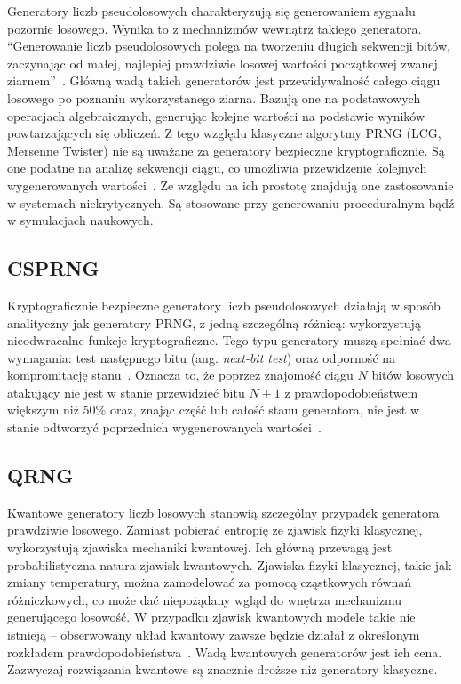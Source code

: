 \noindent Generatory liczb pseudolosowych charakteryzują się generowaniem sygnału 
pozornie losowego. Wynika to z mechanizmów wewnątrz takiego generatora. 
\enquote{Generowanie liczb pseudolosowych polega na tworzeniu długich sekwencji 
bitów, zaczynając od małej, najlepiej prawdziwie losowej wartości początkowej 
zwanej ziarnem}~\cite{2023anstasios-panagiotis-georgis-yannis}. Główną wadą 
takich generatorów jest przewidywalność całego ciągu losowego po poznaniu 
wykorzystanego ziarna. 
Bazują one na podstawowych operacjach algebraicznych, generując kolejne 
wartości na podstawie wyników powtarzających się obliczeń. Z tego względu 
klasyczne algorytmy PRNG (LCG, Mersenne Twister) nie są uważane za generatory 
bezpieczne kryptograficznie. Są one podatne na analizę sekwencji ciągu, co 
umożliwia przewidzenie kolejnych wygenerowanych 
wartości~\cite{2024-predicting-prngs}.
Ze względu na ich prostotę znajdują one zastosowanie w systemach niekrytycznych. 
Są stosowane przy generowaniu proceduralnym bądź w symulacjach naukowych.

\subsection{CSPRNG}

\noindent Kryptograficznie bezpieczne generatory liczb pseudolosowych działają 
w sposób analityczny jak generatory PRNG, z jedną szczególną różnicą: 
wykorzystują nieodwracalne funkcje kryptograficzne. Tego typu generatory 
muszą spełniać dwa wymagania: test następnego bitu (ang. \textit{next-bit test}) oraz odporność na kompromitację 
stanu~\cite{2023Analisis-of-CSPRNG}. 
Oznacza to, że poprzez znajomość ciągu $N$ bitów losowych atakujący nie jest 
w stanie przewidzieć bitu $N+1$ z prawdopodobieństwem większym niż 50\% oraz, 
znając część lub całość stanu generatora, nie jest w stanie odtworzyć 
poprzednich wygenerowanych wartości~\cite{2023Analisis-of-CSPRNG}.

\subsection{QRNG}

\noindent Kwantowe generatory liczb losowych stanowią szczególny przypadek 
generatora prawdziwie losowego. Zamiast pobierać entropię ze zjawisk fizyki 
klasycznej, wykorzystują zjawiska mechaniki kwantowej. 
Ich główną przewagą jest probabilistyczna natura zjawisk kwantowych. Zjawiska 
fizyki klasycznej, takie jak zmiany temperatury, można zamodelować za pomocą cząstkowych 
równań różniczkowych, co może dać niepożądany wgląd do wnętrza mechanizmu 
generującego losowość. W przypadku zjawisk kwantowych modele takie nie 
istnieją -- obserwowany układ kwantowy zawsze będzie działał z określonym 
rozkładem prawdopodobieństwa~\cite{Quantum-physics-peter-kok}. 
Wadą kwantowych generatorów jest ich cena. Zazwyczaj rozwiązania kwantowe są 
znacznie droższe niż generatory klasyczne.


